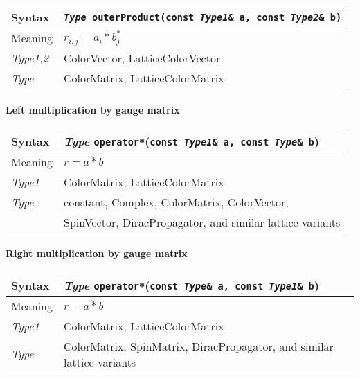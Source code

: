\documentclass[12pt,letterpaper]{article}
\newcommand{\tConstant}{constant}
\newcommand{\tLatticeColorMatrix}{LatticeColorMatrix}
\newcommand{\tComplex}{Complex}
\newcommand{\tColorMatrix}{ColorMatrix}
\newcommand{\tDiracPropagator}{DiracPropagator}
\newcommand{\tSpinMatrix}{SpinMatrix}
\newcommand{\tSpinVector}{SpinVector}
\newcommand{\tColorVector}{ColorVector}
\newcommand{\tLatticeColorVector}{LatticeColorVector}
\newcommand{\itt}{\it Type}
\newcommand{\protoBinaryQual}[1]{{\tt {\it Type} #1(const {\it Type1}\& a, const {\it Type2}\& b)}}
\begin{document}
\begin{flushleft}
  \begin{tabular}{|l|l|}
  \hline
  Syntax      & \protoBinaryQual{outerProduct} \\
  \hline
  Meaning     & $r_{i,j} = a_i * b_j^*$ \\
  \hline
  {\it Type1,2} & \tColorVector, \tLatticeColorVector\\
  \itt        & \tColorMatrix, \tLatticeColorMatrix\\
  \hline
  \end{tabular}
\end{flushleft}

\paragraph{Left multiplication by gauge matrix}

\begin{flushleft}
  \begin{tabular}{|l|l|}
  \hline
  Syntax      & {\it Type} \verb|operator*|({\tt const {\it Type1}\& a, const {\it Type}\& b})\\
  \hline
  Meaning     & $r = a * b$ \\
  \hline
  {\it Type1} & \tColorMatrix, \tLatticeColorMatrix\\
  \itt        & \tConstant, \tComplex, \tColorMatrix, \tColorVector, \\
              & \tSpinVector, \tDiracPropagator,
                and similar lattice variants\\
  \hline
  \end{tabular}
\end{flushleft}


\paragraph{Right multiplication by gauge matrix}

\begin{flushleft}
  \begin{tabular}{|l|l|}
  \hline
  Syntax      & {\it Type} \verb|operator*|({\tt const {\it Type}\& a, const {\it Type1}\& b})\\
  \hline
  Meaning     & $r = a * b$ \\
  \hline
  {\it Type1} & \tColorMatrix, \tLatticeColorMatrix\\
  \itt        & \tColorMatrix, \tSpinMatrix, \tDiracPropagator,
                and similar lattice variants\\
  \hline
  \end{tabular}
\end{flushleft}
\end{document}
